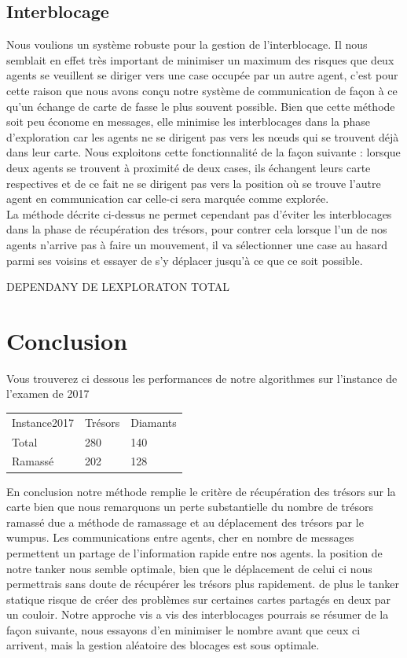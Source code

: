 \documentclass[10pt]{article}
\newcommand\tab[1][0.65cm]{\hspace*{#1}}
\begin{document}
	
\subsection{Interblocage}
\tab Nous voulions un système robuste pour la gestion de l'interblocage. Il nous semblait en effet très important de minimiser un maximum des risques que deux agents se veuillent se diriger vers une case occupée par un autre agent, c'est pour cette raison que nous avons conçu notre système de communication de façon à ce qu'un échange de carte de fasse le plus souvent possible. Bien que cette méthode soit peu économe en messages, elle minimise les interblocages dans la phase d'exploration car les agents ne se dirigent pas vers les n\oe{}uds qui se trouvent déjà dans leur carte. Nous exploitons cette fonctionnalité de la façon suivante : lorsque deux agents se trouvent à proximité de deux cases, ils échangent leurs carte respectives et de ce fait ne se dirigent pas vers la position où se trouve l'autre agent en communication car celle-ci sera marquée comme explorée.\\
\tab La méthode décrite ci-dessus ne permet cependant pas d'éviter les interblocages dans la phase de récupération des trésors, pour contrer cela lorsque l'un de nos agents n'arrive pas à faire un mouvement, il va sélectionner une case au hasard parmi ses voisins et essayer de s'y déplacer jusqu'à ce que ce soit possible.

 DEPENDANY DE LEXPLORATON TOTAL
\section{Conclusion}
\tab Vous trouverez ci dessous les performances de notre algorithmes sur l'instance de l'examen de 2017\\
\begin{center}
\begin{tabular}{lll}
   Instance2017 & Trésors & Diamants \\
   Total & 280 & 140\\
   Ramassé & 202 & 128 \\
\end{tabular}
\end{center}
\tab
En conclusion notre méthode remplie le critère de récupération des trésors sur la carte bien que nous remarquons un perte substantielle du nombre de trésors ramassé due a méthode de ramassage et au déplacement des trésors par le wumpus. Les communications entre agents, cher en nombre de messages permettent un partage de l'information rapide entre nos agents. la position de notre tanker nous semble optimale, bien que le déplacement de celui ci nous permettrais sans doute de récupérer les trésors plus rapidement. de plus le tanker statique risque de créer des problèmes sur certaines cartes partagés en deux par un couloir. Notre approche vis a vis des interblocages pourrais se résumer de la façon suivante, nous essayons d'en minimiser le nombre avant que ceux ci arrivent, mais la gestion aléatoire des blocages est sous optimale.
\end{document}

